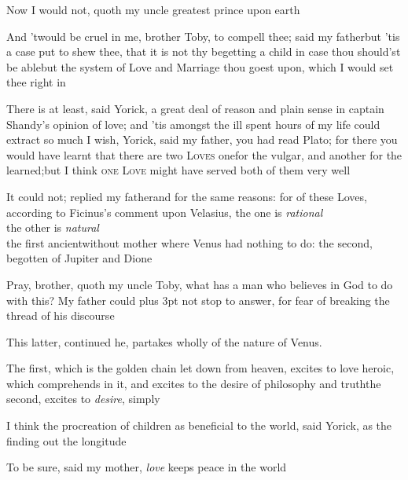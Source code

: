 \documentclass[twoside]{article}
\begin{document}
Now I would not, quoth my uncle
greatest prince upon earth\tsh

\tsh And ’twould be cruel in me, brother
Toby, to compell thee; said my father\tsk but ’tis a
case put to shew thee, that it is not thy begetting a
child\break
\tsk in case thou should’st be able\tsk but the
system of Love and Marriage thou goest upon, which I would set thee
right in\tsh

There is at least, said Yorick, a great deal of reason
and plain sense in captain Shandy’s opinion of love;
and ’tis amongst the ill spent hours of my life
could extract so much\tsh\etp{}
I wish, Yorick, said my father, you\break 
had read Plato; for there you would have learnt that there are two
\textsc{Loves}\tsk\break 
{}
one\tsk for the vulgar, and another for the
learned;\tsk but I think \textsc{one Love}
might have served both of them very well\tsk 

It could not; replied my father\tsk and for the same reasons:
for of these Loves, according to Ficinus’s comment
upon Velasius, the one is \textit{rational}\tsh\\
\null\quad\tsh the other is \textit{natural}\tsh \\
the first ancient\tsh without mother \tsh\break where
Venus had nothing to do: the second, begotten of
Jupiter and Dione\tsk

\tsh Pray, brother, quoth my uncle Toby, what
has a man who believes in God to do with this? My father could
\bgroup\parskip=3pt plus 3pt%
not stop to answer, for fear of breaking the
thread of his discourse\tsh

This latter, continued he, partakes wholly of
the nature of Venus.

The first, which is the golden chain let down
from heaven, excites to love heroic, which
comprehends in it, and excites to the desire of
philosophy and truth\tsh the second, excites to
\textit{desire}, simply\tsh

\tsh I think the procreation of children as beneficial
to the world, said Yorick, as the finding out the
longitude\tsh

\tsh To be sure, said my mother, \textit{love} keeps
peace in the world\tsh
\end{document}

